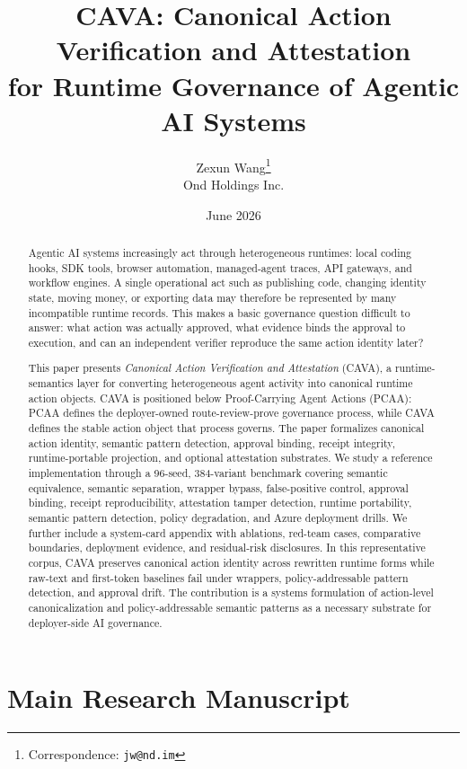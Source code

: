\documentclass[11pt]{article}
\title{
  CAVA: Canonical Action Verification and Attestation\\
  for Runtime Governance of Agentic AI Systems
}
\author{Zexun Wang\thanks{Correspondence: \texttt{jw@nd.im}}\\Ond Holdings Inc.}
\date{June 2026}
\begin{document}
\maketitle

\begin{abstract}
Agentic AI systems increasingly act through heterogeneous runtimes: local coding hooks, SDK tools, browser automation, managed-agent traces, API gateways, and workflow engines. A single operational act such as publishing code, changing identity state, moving money, or exporting data may therefore be represented by many incompatible runtime records. This makes a basic governance question difficult to answer: what action was actually approved, what evidence binds the approval to execution, and can an independent verifier reproduce the same action identity later?

This paper presents \emph{Canonical Action Verification and Attestation} (CAVA), a runtime-semantics layer for converting heterogeneous agent activity into canonical runtime action objects. CAVA is positioned below Proof-Carrying Agent Actions (PCAA): PCAA defines the deployer-owned route-review-prove governance process, while CAVA defines the stable action object that process governs. The paper formalizes canonical action identity, semantic pattern detection, approval binding, receipt integrity, runtime-portable projection, and optional attestation substrates. We study a reference implementation through a 96-seed, 384-variant benchmark covering semantic equivalence, semantic separation, wrapper bypass, false-positive control, approval binding, receipt reproducibility, attestation tamper detection, runtime portability, semantic pattern detection, policy degradation, and Azure deployment drills. We further include a system-card appendix with ablations, red-team cases, comparative boundaries, deployment evidence, and residual-risk disclosures. In this representative corpus, CAVA preserves canonical action identity across rewritten runtime forms while raw-text and first-token baselines fail under wrappers, policy-addressable pattern detection, and approval drift. The contribution is a systems formulation of action-level canonicalization and policy-addressable semantic patterns as a necessary substrate for deployer-side AI governance.
\end{abstract}

\part{Main Research Manuscript}
\end{document}

